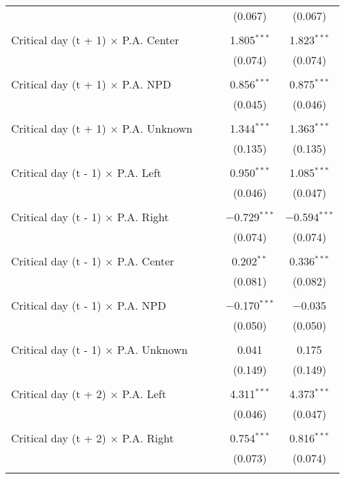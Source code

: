 \documentclass[
]{article}
\begin{document}
\begin{table}[!htbp]
{\begin{tabular}{@{\extracolsep{5pt}}lcccc}
  &  &  & (0.067) & (0.067) \\ 
  & & & & \\ 
 Critical day (t + 1) $\times$ P.A. Center &  &  & 1.805$^{***}$ & 1.823$^{***}$ \\ 
  &  &  & (0.074) & (0.074) \\ 
  & & & & \\ 
 Critical day (t + 1) $\times$ P.A. NPD &  &  & 0.856$^{***}$ & 0.875$^{***}$ \\ 
  &  &  & (0.045) & (0.046) \\ 
  & & & & \\ 
 Critical day (t + 1) $\times$ P.A. Unknown &  &  & 1.344$^{***}$ & 1.363$^{***}$ \\ 
  &  &  & (0.135) & (0.135) \\ 
  & & & & \\ 
 Critical day (t - 1) $\times$ P.A. Left &  &  & 0.950$^{***}$ & 1.085$^{***}$ \\ 
  &  &  & (0.046) & (0.047) \\ 
  & & & & \\ 
 Critical day (t - 1) $\times$ P.A. Right &  &  & $-$0.729$^{***}$ & $-$0.594$^{***}$ \\ 
  &  &  & (0.074) & (0.074) \\ 
  & & & & \\ 
 Critical day (t - 1) $\times$ P.A. Center &  &  & 0.202$^{**}$ & 0.336$^{***}$ \\ 
  &  &  & (0.081) & (0.082) \\ 
  & & & & \\ 
 Critical day (t - 1) $\times$ P.A. NPD &  &  & $-$0.170$^{***}$ & $-$0.035 \\ 
  &  &  & (0.050) & (0.050) \\ 
  & & & & \\ 
 Critical day (t - 1) $\times$ P.A. Unknown &  &  & 0.041 & 0.175 \\ 
  &  &  & (0.149) & (0.149) \\ 
  & & & & \\ 
 Critical day (t + 2) $\times$ P.A. Left &  &  & 4.311$^{***}$ & 4.373$^{***}$ \\ 
  &  &  & (0.046) & (0.047) \\ 
  & & & & \\ 
 Critical day (t + 2) $\times$ P.A. Right &  &  & 0.754$^{***}$ & 0.816$^{***}$ \\ 
  &  &  & (0.073) & (0.074) \\ 
  & & & & \\ 

\end{tabular}}
\end{table}
\end{document}

